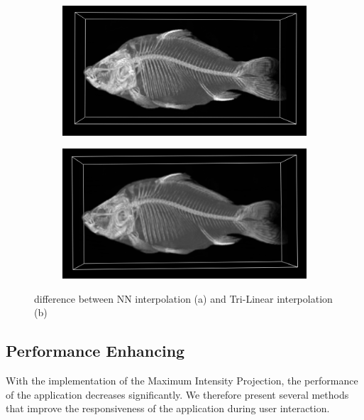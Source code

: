 \begin{figure}[h!]
    \centering
    \captionsetup{justification=centering,margin=0.5cm}
    \begin{subfigure}[t]{0.48\textwidth}
        \includegraphics[width=\textwidth]{img/fish_NN.png}
        \caption{ }
    \end{subfigure}
    \begin{subfigure}[t]{0.48\textwidth}
        \includegraphics[width=\textwidth]{img/fish_TriLin.png}
        \caption{ }
    \end{subfigure}
    \caption{difference between NN interpolation (a) and Tri-Linear interpolation (b)}
    \label{fig:trilinear1}
\end{figure}

\subsection{Performance Enhancing}\label{subsec:perf_enh}
With the implementation of the Maximum Intensity Projection, the performance of the application decreases significantly. We therefore present several methods that improve the responsiveness of the application during user interaction.

